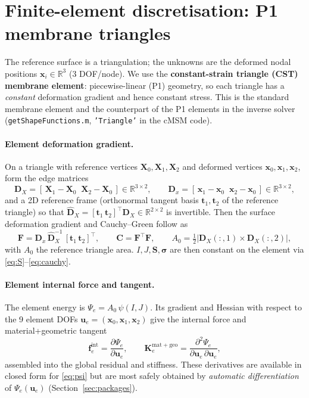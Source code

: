 \documentclass[11pt]{article}
\newcommand{\vv}[1]{\bm{#1}}          %
\newcommand{\FF}{\vv{F}}               %
\newcommand{\CC}{\vv{C}}               %
\newcommand{\Spk}{\vv{S}}               %
\newcommand{\sg}{\vv{\sigma}}          %
\newcommand{\xx}{\vv{x}}               %
\newcommand{\XX}{\vv{X}}               %
\newcommand{\R}{\mathbb{R}}
\begin{document}
\section{Finite-element discretisation: P1 membrane triangles}
\label{sec:fe}

The reference surface is a triangulation; the unknowns are the deformed nodal
positions $\xx_i\in\R^3$ (3 DOF/node). We use the \textbf{constant-strain triangle
(CST) membrane element}: piecewise-linear (P1) geometry, so each triangle has a
\emph{constant} deformation gradient and hence constant stress. This is the standard
membrane element and the counterpart of the P1 elements in the inverse solver
(\texttt{getShapeFunctions.m}, \texttt{'Triangle'} in the cMSM code).

\paragraph{Element deformation gradient.} On a triangle with reference vertices
$\XX_0,\XX_1,\XX_2$ and deformed vertices $\xx_0,\xx_1,\xx_2$, form the edge matrices
\begin{equation}
  \vv D_X=[\,\XX_1-\XX_0\;\;\XX_2-\XX_0\,]\in\R^{3\times2},\qquad
  \vv D_x=[\,\xx_1-\xx_0\;\;\xx_2-\xx_0\,]\in\R^{3\times2},
\end{equation}
and a 2D reference frame (orthonormal tangent basis $\vv t_1,\vv t_2$ of the reference
triangle) so that $\hat{\vv D}_X=[\vv t_1\,\vv t_2]^{\!\top}\vv D_X\in\R^{2\times2}$ is
invertible. Then the surface deformation gradient and Cauchy--Green follow as
\begin{equation}
  \FF=\vv D_x\,\hat{\vv D}_X^{-1}\,[\vv t_1\,\vv t_2]^{\!\top},\qquad
  \CC=\FF^{\!\top}\FF,\qquad
  A_0=\tfrac12\big|\vv D_X(:,1)\times\vv D_X(:,2)\big|,
\end{equation}
with $A_0$ the reference triangle area. $I,J,\Spk,\sg$ are then constant on the element
via \eqref{eq:S}--\eqref{eq:cauchy}.

\paragraph{Element internal force and tangent.} The element energy is
$\Psi_e=A_0\,\psi(I,J)$. Its gradient and Hessian with respect to the 9 element DOFs
$\vv u_e=(\xx_0,\xx_1,\xx_2)$ give the internal force and material+geometric tangent
\begin{equation}
  \vv f^{\mathrm{int}}_e=\frac{\partial\Psi_e}{\partial\vv u_e},\qquad
  \vv K^{\mathrm{mat+geo}}_e=\frac{\partial^2\Psi_e}{\partial\vv u_e\,\partial\vv u_e},
\end{equation}
assembled into the global residual and stiffness. These derivatives are available in
closed form for \eqref{eq:psi} but are most safely obtained by \emph{automatic
differentiation} of $\Psi_e(\vv u_e)$ (Section~\ref{sec:packages}).
\end{document}
